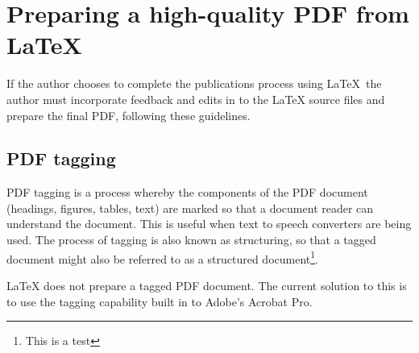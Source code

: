 \chapter{Preparing a high-quality PDF from LaTeX}\label{sec:PDFprep}
If the author chooses to complete the publications process using LaTeX\, the author must incorporate feedback and edits in to the LaTeX source files and prepare the final PDF, following these guidelines.

\section{PDF tagging}\label{sec:PDFtagging}
PDF tagging is a process whereby the components of the PDF document (headings, figures, tables, text) are marked so that a document reader can understand the document. This is useful when text to speech converters are being used. The process of tagging is also known as structuring, so that a tagged document might also be referred to as a structured document\footnote{This is a test}.

LaTeX does not prepare a tagged PDF document. The current solution to this is to use the tagging capability built in to Adobe's Acrobat Pro.

